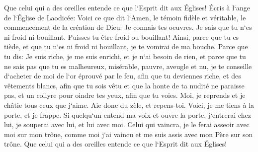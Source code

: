 \verse Que celui qui a des oreilles entende ce que l`Esprit dit aux Églises! 
\verse Écris à l`ange de l`Église de Laodicée: Voici ce que dit l`Amen, le témoin fidèle et véritable, le commencement de la création de Dieu: 
\verse Je connais tes oeuvres. Je sais que tu n`es ni froid ni bouillant. Puisses-tu être froid ou bouillant! 
\verse Ainsi, parce que tu es tiède, et que tu n`es ni froid ni bouillant, je te vomirai de ma bouche. 
\verse Parce que tu dis: Je suis riche, je me suis enrichi, et je n`ai besoin de rien, et parce que tu ne sais pas que tu es malheureux, misérable, pauvre, aveugle et nu, 
\verse je te conseille d`acheter de moi de l`or éprouvé par le feu, afin que tu deviennes riche, et des vêtements blancs, afin que tu sois vêtu et que la honte de ta nudité ne paraisse pas, et un collyre pour oindre tes yeux, afin que tu voies. 
\verse Moi, je reprends et je châtie tous ceux que j`aime. Aie donc du zèle, et repens-toi. 
\verse Voici, je me tiens à la porte, et je frappe. Si quelqu`un entend ma voix et ouvre la porte, j`entrerai chez lui, je souperai avec lui, et lui avec moi. 
\verse Celui qui vaincra, je le ferai asseoir avec moi sur mon trône, comme moi j`ai vaincu et me suis assis avec mon Père sur son trône. 
\verse Que celui qui a des oreilles entende ce que l`Esprit dit aux Églises! 


